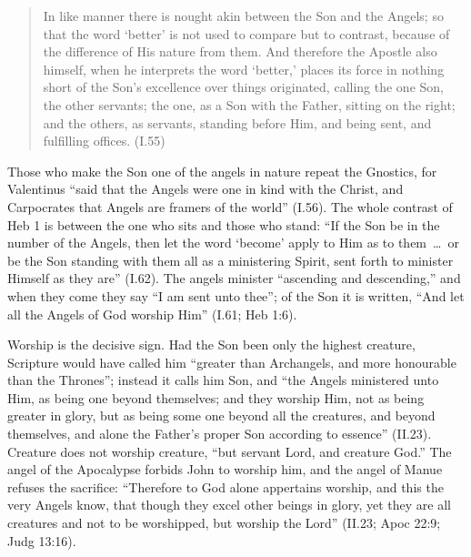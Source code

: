 \begin{quote}
In like manner there is nought akin between the Son and the Angels; so
that the word `better' is not used to compare but to contrast, because of
the difference of His nature from them. And therefore the Apostle also
himself, when he interprets the word `better,' places its force in
nothing short of the Son's excellence over things originated, calling the
one Son, the other servants; the one, as a Son with the Father, sitting
on the right; and the others, as servants, standing before Him, and being
sent, and fulfilling offices. (I.55)
\end{quote}

\noindent Those who make the Son one of the angels in nature repeat the
Gnostics, for Valentinus ``said that the Angels were one in kind with the
Christ, and Carpocrates that Angels are framers of the world'' (I.56).
The whole contrast of Heb 1 is between the one who sits and those who
stand: ``If the Son be in the number of the Angels, then let the word
`become' apply to Him as to them~\dots\ or be the Son standing with them
all as a ministering Spirit, sent forth to minister Himself as they
are'' (I.62). The angels minister ``ascending and descending,'' and when
they come they say ``I am sent unto thee''; of the Son it is written,
``And let all the Angels of God worship Him'' (I.61; Heb 1:6).

Worship is the decisive sign. Had the Son been only the highest
creature, Scripture would have called him ``greater than Archangels, and
more honourable than the Thrones''; instead it calls him Son, and ``the
Angels ministered unto Him, as being one beyond themselves; and they
worship Him, not as being greater in glory, but as being some one beyond
all the creatures, and beyond themselves, and alone the Father's proper
Son according to essence'' (II.23). Creature does not worship creature,
``but servant Lord, and creature God.'' The angel of the Apocalypse
forbids John to worship him, and the angel of Manue refuses the
sacrifice: ``Therefore to God alone appertains worship, and this the
very Angels know, that though they excel other beings in glory, yet they
are all creatures and not to be worshipped, but worship the Lord''
(II.23; Apoc 22:9; Judg 13:16).

